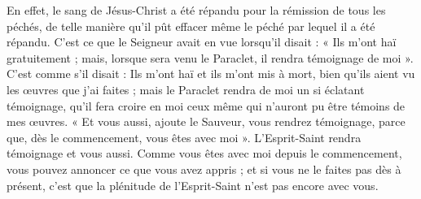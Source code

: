 En effet, le sang de Jésus-Christ a été répandu pour la rémission de tous les péchés, de telle manière qu’il pût effacer même le péché par lequel il a été répandu. C’est ce que le Seigneur avait en vue lorsqu’il disait : « Ils m’ont haï gratuitement ; mais, lorsque sera venu le Paraclet, il rendra témoignage de moi ». C’est comme s’il disait : Ils m’ont haï et ils m’ont mis à mort, bien qu’ils aient vu les œuvres que j’ai faites ; mais le Paraclet rendra de moi un si éclatant témoignage, qu’il fera croire en moi ceux même qui n’auront pu être témoins de mes œuvres. « Et vous aussi, ajoute le Sauveur, vous rendrez témoignage, parce que, dès le commencement, vous êtes avec moi ». L’Esprit-Saint rendra témoignage et vous aussi. Comme vous êtes avec moi depuis le commencement, vous pouvez annoncer ce que vous avez appris ; et si vous ne le faites pas dès à présent, c’est que la plénitude de l’Esprit-Saint n’est pas encore avec vous.